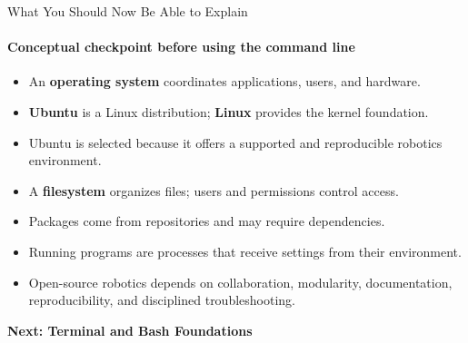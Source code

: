 \begin{frame}{What You Should Now Be Able to Explain}
\framesubtitle{Conceptual checkpoint before using the command line}

\begin{itemize}
    \item An \textbf{operating system} coordinates applications, users, and hardware.
    \item \textbf{Ubuntu} is a Linux distribution; \textbf{Linux} provides the kernel foundation.
    \item Ubuntu is selected because it offers a supported and reproducible robotics environment.
    \item A \textbf{filesystem} organizes files; users and permissions control access.
    \item Packages come from repositories and may require dependencies.
    \item Running programs are processes that receive settings from their environment.
    \item Open-source robotics depends on collaboration, modularity, documentation,
          reproducibility, and disciplined troubleshooting.
\end{itemize}

\pause

\begin{center}
    \Large
    \textbf{Next: Terminal and Bash Foundations}
\end{center}
\end{frame}






